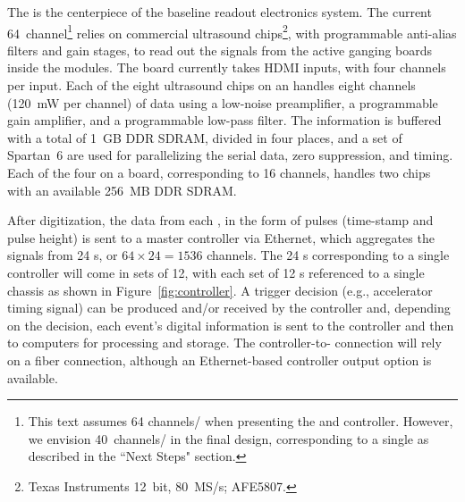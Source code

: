 The  is the centerpiece of the baseline readout electronics system.  
The current 64~channel\footnote{This text assumes 64 channels/ when presenting the  and controller. However, we envision 40~channels/ in the final design, corresponding to a single  as described in the ``Next Steps" section.}  relies on commercial ultrasound chips\footnote{Texas Instruments\texttrademark{} 12~bit, 80~MS/s; AFE5807.},
with programmable anti-alias filters and gain stages, to read out the  signals from the active ganging boards inside the  modules. The board currently takes HDMI inputs, with four channels per input.  Each of the eight ultrasound chips on an  handles eight channels (\SI{120}{mW} per channel) of data using a low-noise preamplifier, a programmable gain amplifier, and a programmable low-pass filter. The information is buffered with a total of \SI{1}{GB} DDR SDRAM, divided in four places, and a set of Spartan~6\texttrademark {} are used for parallelizing the serial  data, zero suppression, and timing. Each of the four  on a board, corresponding to 16 channels, handles two  chips with an available \SI{256}{MB} DDR SDRAM. 

After digitization, the data from each , in the form of pulses (time-stamp and pulse height) is sent to a master controller via Ethernet, which aggregates the signals from 24 s, or $64 \times 24=1536$ channels. The 24 s corresponding to a single controller will come in sets of 12, with each set of 12 s referenced to a single chassis as shown in %
Figure~\ref{fig:controller}. A trigger decision (e.g., accelerator timing signal) can be produced and/or received by the controller and, depending on the decision, each event's digital information is sent to the controller and then to  computers for processing and storage. The controller-to- connection will rely on a fiber connection, although an Ethernet-based controller output option is available.


